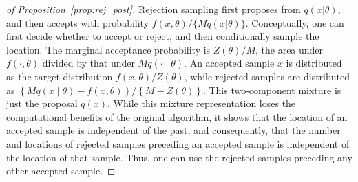 


\begin{proof}[of Proposition~\ref{prop:rej_post}]
  Rejection sampling first proposes from $q(x|\theta)$, and then accepts with probability $f(x,\theta)/\{Mq(x|\theta)\}$. %
  Conceptually, one can first decide whether to accept or reject, and then conditionally sample the location.
  The marginal acceptance probability is $Z(\theta)/M$, the area under $f(\cdot,\theta)$ divided by that under $M q(\cdot\mid\theta)$.
  An accepted sample $x$ is distributed as the target distribution $f(x, \theta)/Z(\theta)$, while rejected samples are distributed as 
  $\left\{{Mq(x\mid\theta) - f(x,\theta)}\right\}/\left\{M-Z(\theta)\right\}$. This two-component mixture is just the proposal $q(x)$.
  While this mixture representation loses the computational benefits of the original algorithm, it shows that the location of an accepted sample is independent
  of the past, and consequently, that the number and locations of rejected samples preceding an accepted sample is independent of the location
  of that sample. Thus, one can use the rejected samples preceding any other accepted sample.
\end{proof}




